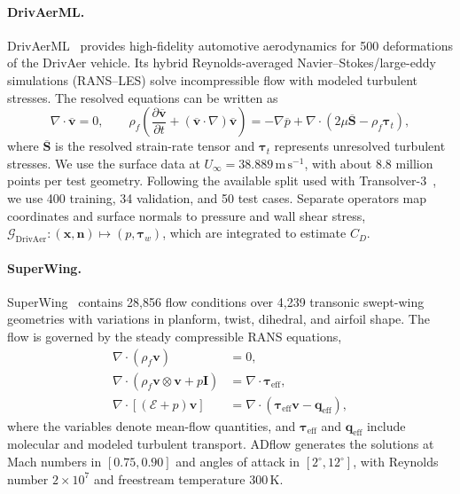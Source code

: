 \documentclass{article}
\begin{document}
\paragraph{DrivAerML.}
DrivAerML~\citep{ashton2024drivaerml} provides high-fidelity automotive aerodynamics for 500 deformations of the DrivAer vehicle. Its hybrid Reynolds-averaged Navier--Stokes/large-eddy simulations (RANS--LES) solve incompressible flow with modeled turbulent stresses. The resolved equations can be written as
\begin{equation}
    \nabla\!\cdot\overline{\mathbf{v}}=0,
    \qquad
    \rho_f\left(\frac{\partial\overline{\mathbf{v}}}{\partial t}
    +(\overline{\mathbf{v}}\!\cdot\nabla)\overline{\mathbf{v}}\right)
    =-\nabla\overline{p}
    +\nabla\!\cdot\left(2\mu\overline{\mathbf{S}}-\rho_f\boldsymbol{\tau}_t\right),
    \label{eq:app_drivaerml}
\end{equation}
where $\overline{\mathbf{S}}$ is the resolved strain-rate tensor and $\boldsymbol{\tau}_t$ represents unresolved turbulent stresses. We use the surface data at $U_\infty=38.889\,\mathrm{m\,s^{-1}}$, with about 8.8 million points per test geometry. Following the available split used with Transolver-3~\citep{zhou2026transolver3}, we use 400 training, 34 validation, and 50 test cases. Separate operators map coordinates and surface normals to pressure and wall shear stress, $\mathcal{G}_{\mathrm{DrivAer}}:(\mathbf{x},\mathbf{n})\mapsto(p,\boldsymbol{\tau}_w)$, which are integrated to estimate $C_D$.

\paragraph{SuperWing.}
SuperWing~\citep{yang2025superwing} contains 28,856 flow conditions over 4,239 transonic swept-wing geometries with variations in planform, twist, dihedral, and airfoil shape. The flow is governed by the steady compressible RANS equations,
\begin{equation}
    \begin{aligned}
        \nabla\!\cdot(\rho_f\mathbf{v})&=0,\\
        \nabla\!\cdot(\rho_f\mathbf{v}\otimes\mathbf{v}+p\mathbf{I})
        &=\nabla\!\cdot\boldsymbol{\tau}_{\mathrm{eff}},\\
        \nabla\!\cdot[(\mathcal{E}+p)\mathbf{v}]
        &=\nabla\!\cdot(\boldsymbol{\tau}_{\mathrm{eff}}\mathbf{v}-\mathbf{q}_{\mathrm{eff}}),
    \end{aligned}
    \label{eq:app_superwing}
\end{equation}
where the variables denote mean-flow quantities, and $\boldsymbol{\tau}_{\mathrm{eff}}$ and $\mathbf{q}_{\mathrm{eff}}$ include molecular and modeled turbulent transport. ADflow generates the solutions at Mach numbers in $[0.75,0.90]$ and angles of attack in $[2^{\circ},12^{\circ}]$, with Reynolds number $2\times10^7$ and freestream temperature $300\,\mathrm{K}$.
\end{document}
